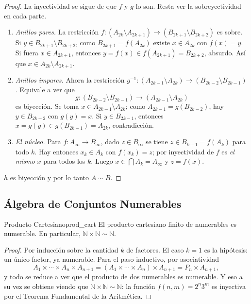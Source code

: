 \documentclass[11pt, a4paper]{article}
\begin{document}
\begin{proof}
La inyectividad se sigue de que $f$ y $g$ lo son. Resta ver la sobreyectividad en cada parte.

\begin{enumerate}
    \item \textit{Anillos pares.} La restricción
    $f: (A_{2k} \setminus A_{2k+1}) \to (B_{2k+1} \setminus B_{2k+2})$ es sobre. Si
    $y \in B_{2k+1} \setminus B_{2k+2}$, como $B_{2k+1} = f(A_{2k})$ existe $x \in A_{2k}$ con
    $f(x) = y$. Si fuera $x \in A_{2k+1}$, entonces $y = f(x) \in f(A_{2k+1}) = B_{2k+2}$, absurdo.
    Así que $x \in A_{2k} \setminus A_{2k+1}$.

    \item \textit{Anillos impares.} Ahora la restricción
    $g^{-1}: (A_{2k-1} \setminus A_{2k}) \to (B_{2k-2} \setminus B_{2k-1})$. Equivale a ver que
    $$ g: (B_{2k-2} \setminus B_{2k-1}) \to (A_{2k-1} \setminus A_{2k}) $$
    es biyección. Se toma $x \in A_{2k-1} \setminus A_{2k}$; como $A_{2k-1} = g(B_{2k-2})$, hay
    $y \in B_{2k-2}$ con $g(y) = x$. Si $y \in B_{2k-1}$, entonces
    $x = g(y) \in g(B_{2k-1}) = A_{2k}$, contradicción.

    \item \textit{El núcleo.} Para $f: A_\infty \to B_\infty$, dado $z \in B_\infty$ se tiene
    $z \in B_{k+1} = f(A_k)$ para todo $k$. Hay entonces $x_k \in A_k$ con $f(x_k) = z$; por
    inyectividad de $f$ es \emph{el mismo} $x$ para todos los $k$. Luego
    $x \in \bigcap A_k = A_\infty$ y $z = f(x)$.
\end{enumerate}
$h$ es biyección y por lo tanto $A \sim B$.
\end{proof}

\subsection{Álgebra de Conjuntos Numerables}

\begin{teorema}{Producto Cartesiano}{prod_cart}
El producto cartesiano finito de numerables es numerable. En particular,
$\mathbb{N} \times \mathbb{N} \sim \mathbb{N}$.
\end{teorema}
\begin{proof}
Por inducción sobre la cantidad $k$ de factores. El caso $k=1$ es la hipótesis: un único
factor, ya numerable. Para el paso inductivo, por asociatividad
$$ A_1 \times \cdots \times A_n \times A_{n+1} = (A_1 \times \cdots \times A_n) \times A_{n+1} = P_n
\times A_{n+1}, $$
y todo se reduce a ver que el producto de dos numerables es numerable. Y eso a su vez se obtiene
viendo que $\mathbb{N} \times \mathbb{N} \sim \mathbb{N}$: la función $f(n,m) = 2^n 3^m$ es
inyectiva por el Teorema Fundamental de la Aritmética.
\end{proof}
\end{document}
